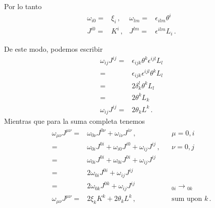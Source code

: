 \begin{frame}
Por lo tanto
\begin{align}
\label{eq:thijk}
  \omega_{i0}=&\xi_i\,, &\omega_{lm}=&\epsilon_{ilm}\theta^i\nonumber\\
  J^{i0}=&K^i\,, & J^{lm}=& \epsilon^{ilm}L_i\,.                  
\end{align}
\end{frame}

De este modo, podemos escribir
\begin{align}
  \omega_{ij} J^{ij}=&\epsilon_{ijk}\theta^{k} \epsilon^{ijl}L_l \nonumber\\
             =&\epsilon_{ijk} \epsilon^{ijl} \theta^k L_l \nonumber\\
             =&2 \delta_k^l\theta^k L_l \nonumber\\
             =&2 \theta^k L_k \nonumber\\
    \omega_{ij} J^{ij} =&2 \theta_k L^k \,.
\end{align}
Mientras que para la suma completa tenemos
\begin{align}
  \label{eq:wjexp}
  \omega_{\mu\nu}J^{\mu\nu}=&\omega_{0\nu}J^{0\nu}+\omega_{i\nu}J^{i\nu}\,,&& \mu=0,i \nonumber\\
                          =&\omega_{0i}J^{0i}+\omega_{i0}J^{i0}+\omega_{ij}J^{ij}\,,&&\nu=0,j \nonumber\\
                          =&\omega_{0i}J^{0i}+\omega_{0i}J^{0i}+\omega_{ij}J^{ij}&& \nonumber\\
                          =&2\omega_{0i}J^{0i}+\omega_{ij}J^{ij}&& \nonumber\\
                          =&2\omega_{0k}J^{0k}+\omega_{ij}J^{ij}&& {}_{0i}\to {}_{0k}\nonumber\\
 \omega_{\mu\nu}J^{\mu\nu}   =&2\xi_k K^k+2\theta_k L^k\,,&&\text{sum upon $k$}\,.
\end{align}


